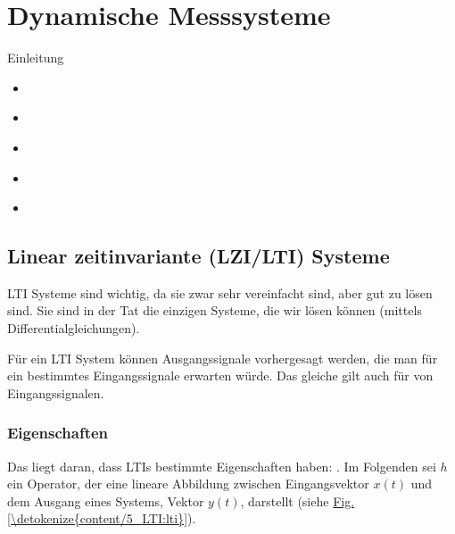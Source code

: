 \documentclass[letterpaper,10pt,english]{jupyterBook}
\begin{document}
\sphinxstepscope


\chapter{Dynamische Messsysteme}
\label{\detokenize{content/5_Dynamische_Messsysteme:dynamische-messsysteme}}\label{\detokenize{content/5_Dynamische_Messsysteme::doc}}
\sphinxAtStartPar
Einleitung
\begin{itemize}
\item {} 
\sphinxAtStartPar
{\hyperref[\detokenize{content/5_LTI::doc}]{}}

\item {} 
\sphinxAtStartPar
{\hyperref[\detokenize{content/5_DGL::doc}]{}}

\item {} 
\sphinxAtStartPar
{\hyperref[\detokenize{content/5_ImpulsSprung::doc}]{}}

\item {} 
\sphinxAtStartPar
{\hyperref[\detokenize{content/5_Uebertragungsfunktion::doc}]{}}

\item {} 
\sphinxAtStartPar
{\hyperref[\detokenize{content/5_faltung::doc}]{}}

\end{itemize}

\sphinxstepscope


\section{Linear zeitinvariante (LZI/LTI) Systeme}
\label{\detokenize{content/5_LTI:linear-zeitinvariante-lzi-lti-systeme}}\label{\detokenize{content/5_LTI::doc}}
\sphinxAtStartPar


\sphinxAtStartPar
LTI Systeme sind wichtig, da sie zwar sehr vereinfacht sind, aber gut zu lösen sind. Sie sind in der Tat die einzigen Systeme, die wir lösen können (mittels Differentialgleichungen).

\sphinxAtStartPar
Für ein LTI System können Ausgangssignale vorhergesagt werden, die man für ein bestimmtes Eingangssignale erwarten würde. Das gleiche gilt auch für  von Eingangssignalen.


\subsection{Eigenschaften}
\label{\detokenize{content/5_LTI:eigenschaften}}
\sphinxAtStartPar
Das liegt daran, dass LTIs bestimmte Eigenschaften haben: .
Im Folgenden sei \(h\) ein Operator, der eine lineare Abbildung zwischen Eingangsvektor \(x(t)\) und dem Ausgang eines Systems, Vektor \(y(t)\), darstellt (siehe \hyperref[\detokenize{content/5_LTI:lti}]{Fig.\@ \ref{\detokenize{content/5_LTI:lti}}}).
\end{document}
